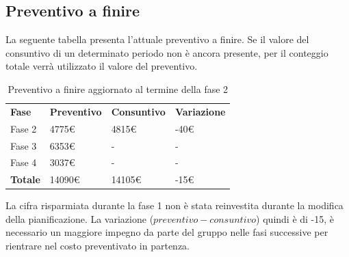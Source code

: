 	\newpage
	\subsection{Preventivo a finire}
La seguente tabella presenta l'attuale preventivo a finire. Se il valore del consuntivo di un determinato periodo non è ancora presente, per il conteggio totale verrà utilizzato il valore del preventivo.

\begin{table}[H]
			\centering
		\begin{tabular}{| l | l | l | l |}
			\rowcolor{LightBlue}
			\textbf{\color{white}Fase}
			& \textbf{\color{white}Preventivo}
			& \textbf{\color{white}Consuntivo}
			& \textbf{\color{white}Variazione}
			\\
			
			Fase 2 			& 4775€ 	& 4815€ & -40€\\
			Fase 3 		& 6353€ 	& - & -\\
			Fase 4			& 3037€ 	& - & -\\
			\textbf{Totale} & 14090€ & 14105€ & -15€\\ \hline
		\end{tabular}
		\caption{Preventivo a finire aggiornato al termine della fase 2}	
\end{table}
La cifra risparmiata durante la fase 1 non è stata reinvestita durante la modifica della pianificazione. La variazione ($preventivo - consuntivo$) quindi è di -15, è necessario un maggiore impegno da parte del gruppo nelle fasi successive per rientrare nel costo preventivato in partenza. 

\newpage
